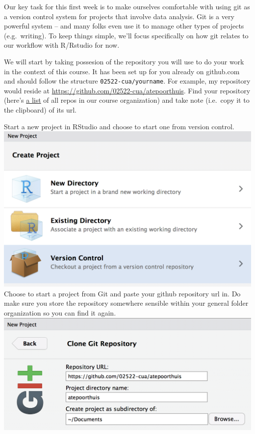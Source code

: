 \documentclass[]{book}
\begin{document}
Our key task for this first week is to make ourselves comfortable with using git as a version control system for projects that involve data analysis. Git is a very powerful system -- and many folks even use it to manage other types of projects (e.g.~writing). To keep things simple, we'll focus specifically on how git relates to our workflow with R/Rstudio for now.

We will start by taking possesion of the repository you will use to do your work in the context of this course. It has been set up for you already on github.com and should follow the structure \texttt{02522-cua/yourname}. For example, my repository would reside at \url{https://github.com/02522-cua/atepoorthuis}. Find your repository (here's \href{https://github.com/02522-cua}{a list} of all repos in our course organization) and take note (i.e.~copy it to the clipboard) of its url.

Start a new project in RStudio and choose to start one from version control.
\includegraphics{images/project_vc.png}
Choose to start a project from Git and paste your github repository url in. Do make sure you store the repository somewhere sensible within your general folder organization so you can find it again.
\includegraphics{images/git_clone.png}
\end{document}
